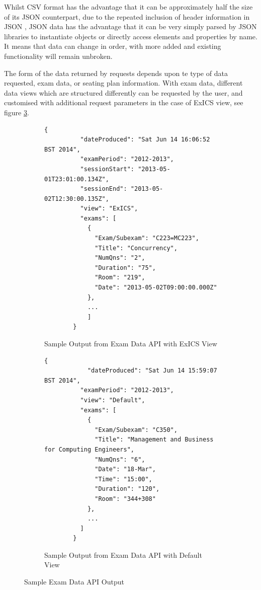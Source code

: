 Whilst CSV format has the advantage that it can be approximately half the size of its JSON counterpart, due to the repeated inclusion of header information in JSON \cite{csvVsJSON}, JSON data has the advantage that it can be very simply parsed by JSON libraries to instantiate objects or directly access elements and properties by name.  It means that data can change in order, with more added and existing functionality will remain unbroken.

The form of the data returned by requests depends upon te type of data requested, exam data, or seating plan information.  With exam data, different data views which are structured differently can be requested by the user, and customised with additional request parameters in the case of ExICS view, see figure \ref{fig:samp_exam_data_output}.

\begin{figure}[h]
	\begin{subfigure}[b]{0.9\textwidth}
		\centering
		\lstset{language=JSON}
		\begin{lstlisting}[tabsize=2,breaklines=true]
		{
		  "dateProduced": "Sat Jun 14 16:06:52 BST 2014",
		  "examPeriod": "2012-2013",
		  "sessionStart": "2013-05-01T23:01:00.134Z",
		  "sessionEnd": "2013-05-02T12:30:00.135Z",
		  "view": "ExICS",
		  "exams": [
		    {
		      "Exam/Subexam": "C223=MC223",
		      "Title": "Concurrency",
		      "NumQns": "2",
		      "Duration": "75",
		      "Room": "219",
		      "Date": "2013-05-02T09:00:00.000Z"
		    },
		  	...
		 	]
		}
		\end{lstlisting}
		\caption{Sample Output from Exam Data API with ExICS View}
		\label{subfig:ExICS_view}
	\end{subfigure}
	\newline
	\begin{subfigure}[b]{0.9\textwidth}
		\centering
		\lstset{language=JSON}
		\begin{lstlisting}[tabsize=2,breaklines=true]
		{
			"dateProduced": "Sat Jun 14 15:59:07 BST 2014",
		  "examPeriod": "2012-2013",
		  "view": "Default",
		  "exams": [
		    {
		      "Exam/Subexam": "C350",
		      "Title": "Management and Business for Computing Engineers",
		      "NumQns": "6",
		      "Date": "18-Mar",
		      "Time": "15:00",
		      "Duration": "120",
		      "Room": "344+308"
		    },
		  	...
		  ]
		}
		\end{lstlisting}
		\caption{Sample Output from Exam Data API with Default View}
		\label{subfig:default_view}
	\end{subfigure}
	\caption{Sample Exam Data API Output}
	\label{fig:samp_exam_data_output}
\end{figure}

